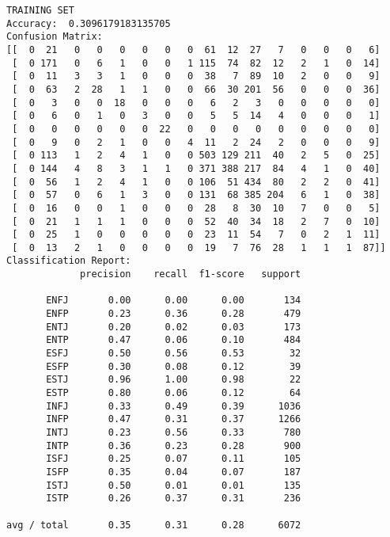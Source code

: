 \documentclass[11pt]{article}
\begin{document}
    \begin{Verbatim}[commandchars=\\\{\}]
TRAINING SET
Accuracy:  0.3096179183135705
Confusion Matrix:
[[  0  21   0   0   0   0   0   0  61  12  27   7   0   0   0   6]
 [  0 171   0   6   1   0   0   1 115  74  82  12   2   1   0  14]
 [  0  11   3   3   1   0   0   0  38   7  89  10   2   0   0   9]
 [  0  63   2  28   1   1   0   0  66  30 201  56   0   0   0  36]
 [  0   3   0   0  18   0   0   0   6   2   3   0   0   0   0   0]
 [  0   6   0   1   0   3   0   0   5   5  14   4   0   0   0   1]
 [  0   0   0   0   0   0  22   0   0   0   0   0   0   0   0   0]
 [  0   9   0   2   1   0   0   4  11   2  24   2   0   0   0   9]
 [  0 113   1   2   4   1   0   0 503 129 211  40   2   5   0  25]
 [  0 144   4   8   3   1   1   0 371 388 217  84   4   1   0  40]
 [  0  56   1   2   4   1   0   0 106  51 434  80   2   2   0  41]
 [  0  57   0   6   1   3   0   0 131  68 385 204   6   1   0  38]
 [  0  16   0   0   1   0   0   0  28   8  30  10   7   0   0   5]
 [  0  21   1   1   1   0   0   0  52  40  34  18   2   7   0  10]
 [  0  25   1   0   0   0   0   0  23  11  54   7   0   2   1  11]
 [  0  13   2   1   0   0   0   0  19   7  76  28   1   1   1  87]]
Classification Report:
             precision    recall  f1-score   support

       ENFJ       0.00      0.00      0.00       134
       ENFP       0.23      0.36      0.28       479
       ENTJ       0.20      0.02      0.03       173
       ENTP       0.47      0.06      0.10       484
       ESFJ       0.50      0.56      0.53        32
       ESFP       0.30      0.08      0.12        39
       ESTJ       0.96      1.00      0.98        22
       ESTP       0.80      0.06      0.12        64
       INFJ       0.33      0.49      0.39      1036
       INFP       0.47      0.31      0.37      1266
       INTJ       0.23      0.56      0.33       780
       INTP       0.36      0.23      0.28       900
       ISFJ       0.25      0.07      0.11       105
       ISFP       0.35      0.04      0.07       187
       ISTJ       0.50      0.01      0.01       135
       ISTP       0.26      0.37      0.31       236

avg / total       0.35      0.31      0.28      6072



\end{Verbatim}
\end{document}
